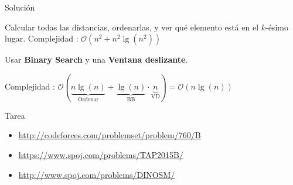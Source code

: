 \documentclass[compress]{beamer}
\begin{document}
\begin{frame}{Solución}
	\begin{enumerate}
		\item Calcular todas las distancias, ordenarlas, y ver qué elemento está en
    el $k$-ésimo lugar. Complejidad : $\mathcal{O}(n^2 + n^2 \lg(n^2))$
		\pause
     {
		\item Usar \textbf{Binary Search} y una \textbf{Ventana deslizante}.
    }
		\pause
		\pause
		\pause
     {
		  Complejidad :
        $\mathcal{O} (\underbrace{n \lg(n)}_{\text{Ordenar}} + \underbrace{\lg(n)}_{\text{BB}} \cdot \underbrace{n}_{\text{VD}}) = \mathcal{O} (n \lg(n))$
    }
	\end{enumerate}
\end{frame}
\begin{frame}{Tarea}
  \begin{itemize}
    \item \url{http://codeforces.com/problemset/problem/760/B}
    \item \url{https://www.spoj.com/problems/TAP2015B/}
    \item \url{http://www.spoj.com/problems/DINOSM/}
  \end{itemize}
\end{frame}
\end{document}
